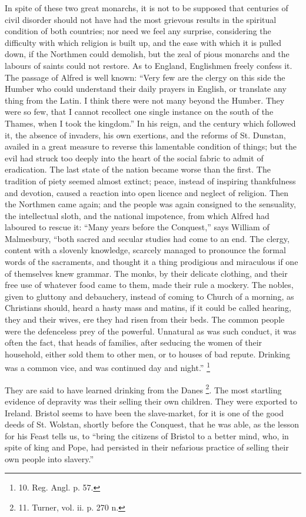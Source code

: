 In spite of these two great
monarchs, it is not to be supposed that centuries of civil disorder
should not have had the most grievous results in the spiritual
condition of both countries; nor need we feel any surprise, considering the difficulty with which religion is built up, and the
ease with which it is pulled down, if the Northmen could demolish, but
the zeal of pious monarchs and the labours of saints could not
restore. As to England, Englishmen freely confess it. The passage of
Alfred is well known: ``Very few are the clergy on this side the Humber
who could understand their daily prayers in English, or translate any
thing from the Latin. I think there were not many beyond the Humber.
They were so few, that I cannot recollect one single instance on the
south of the Thames, when I took the kingdom.'' In his reign, and the
century which followed it, the absence of invaders, his own exertions,
and the reforms of St. Dunstan, availed in a great measure to reverse
this lamentable condition of things; but the evil had struck too
deeply into the heart of the social fabric to admit of eradication.
The last state of the nation became worse than the first. The
tradition of piety seemed almost extinct; peace, instead of inspiring
thankfulness and devotion, caused a reaction into open licence and
neglect of religion. Then the Northmen came again; and the people was
again consigned to the sensuality, the intellectual sloth, and the
national impotence, from which Alfred had laboured to rescue it: ``Many
years before the Conquest,'' says William of Malmesbury, ``both sacred
and secular studies had come to an end. The clergy, content with a
slovenly knowledge, scarcely managed to pronounce the formal words of
the sacraments, and thought it a thing prodigious and miraculous if
one of themselves knew grammar. The monks, by their delicate clothing,
and their free use of whatever food came to them, made their rule a
mockery. The nobles, given to gluttony and debauchery, instead of
coming to Church of a morning, as Christians should, heard a hasty
mass and matins, if it could be called hearing, they and their
wives, ere they had risen from their beds. The common people were the
defenceless prey of the powerful. Unnatural as was such conduct, it
was often the fact, that heads of families, after seducing the women
of their household, either sold them to other men, or to houses of bad
repute. Drinking was a common vice, and was continued day and
night.'' \footnote{10.
Reg. Angl. p. 57.}

They are said to have learned
drinking from the Danes \footnote{11.
Turner, vol. ii. p. 270 n.}.
The most startling evidence of depravity was their selling their own
children. They were exported to Ireland. Bristol seems to have been
the slave-market, for it is one of the good deeds of St. Wolstan,
shortly before the Conquest, that he was able, as the lesson for his
Feast tells us, to ``bring the citizens of Bristol to a better mind,
who, in spite of king and Pope, had persisted in their nefarious
practice of selling their own people into slavery.''

